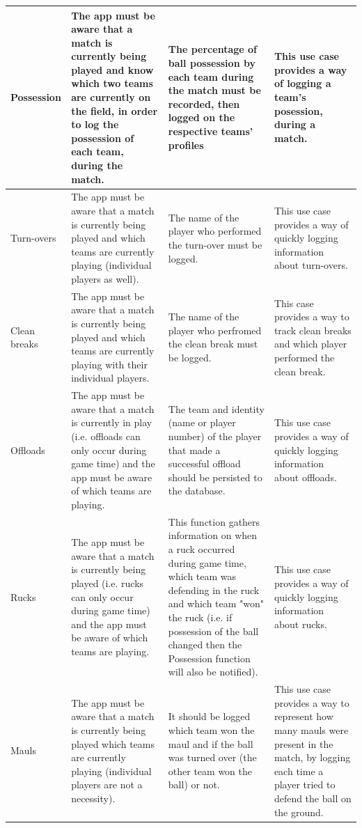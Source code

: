 \documentclass[a4paper,12pt]{report}
\begin{document}
\begin{center}
\begin{longtable}{| p{3cm} | p{4cm} | p{4cm} | p{4cm} |}
    Possession & The app must be aware that a match is currently being played and know which two teams are currently on the field, in order to log the possession of each team, during the match. & The percentage of ball possession by each team during the match must be recorded, then logged on the respective teams' profiles & This use case provides a way of logging a team's posession, during a match.\\ \hline
    Turn-overs & The app must be aware that a match is currently being played and which teams are currently playing (individual players as well). & The name of the player who performed the turn-over must be logged. &  This use case provides a way of quickly logging information about turn-overs.\\ \hline
    Clean breaks & The app must be aware that a match is currently being played and which teams are currently playing with their individual players. & The name of the player who perfromed the clean break must be logged. & This case provides a way to track clean breaks and which player performed the clean break.\\ \hline
    Offloads & The app must be aware that a match is currently in play (i.e. offloads can only occur during game time) and the app must be aware of which teams are playing. & The team and identity (name or player number) of the player that made a successful offload should be persisted to the database. & This use case provides a way of quickly logging information about offloads.\\ \hline
    Rucks & The app must be aware that a match is currently being played (i.e. rucks can only occur during game time) and the app must be aware of which teams are playing. & This function gathers information on when a ruck occurred during game time, which team was defending in the ruck and which team "won" the ruck (i.e. if possession of the ball changed then the Possession function will also be notified). & This use case provides a way of quickly logging information about rucks.\\ \hline
    Mauls & The app must be aware that a match is currently being played which teams are currently playing (individual players are not a necessity). & It should be logged which team won the maul and if the ball was turned over (the other team won the ball) or not. & This use case provides a way to represent how many mauls were present in the match, by logging each time a player tried to defend the ball on the ground.\\ \hline

    \hline
  \end{longtable}
\end{center}
\newpage
\end{document}
